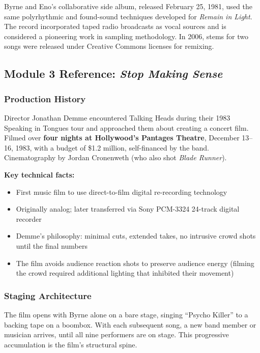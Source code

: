 \documentclass[11pt,letterpaper]{article}
\begin{document}
Byrne and Eno's collaborative side album, released February 25, 1981, used the same polyrhythmic and found-sound techniques developed for \textit{Remain in Light}. The record incorporated taped radio broadcasts as vocal sources and is considered a pioneering work in sampling methodology. In 2006, stems for two songs were released under Creative Commons licenses for remixing.

\subsection{Module 3 Reference: \textit{Stop Making Sense}}

\subsubsection{Production History}

Director Jonathan Demme encountered Talking Heads during their 1983 Speaking in Tongues tour and approached them about creating a concert film. Filmed over \textbf{four nights at Hollywood's Pantages Theatre}, December 13--16, 1983, with a budget of \$1.2 million, self-financed by the band. Cinematography by Jordan Cronenweth (who also shot \textit{Blade Runner}).

\textbf{Key technical facts:}
\begin{itemize}[leftmargin=*]
  \item First music film to use direct-to-film digital re-recording technology
  \item Originally analog; later transferred via Sony PCM-3324 24-track digital recorder
  \item Demme's philosophy: minimal cuts, extended takes, no intrusive crowd shots until the final numbers
  \item The film avoids audience reaction shots to preserve audience energy (filming the crowd required additional lighting that inhibited their movement)
\end{itemize}

\subsubsection{Staging Architecture}

The film opens with Byrne alone on a bare stage, singing ``Psycho Killer'' to a backing tape on a boombox. With each subsequent song, a new band member or musician arrives, until all nine performers are on stage. This progressive accumulation is the film's structural spine.
\end{document}

